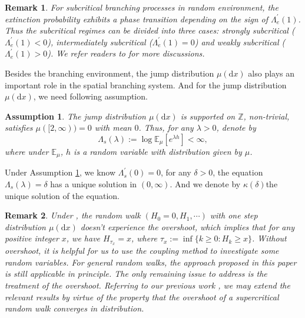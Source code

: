 \documentclass[]{article}
\numberwithin{equation}{section}
\theoremstyle{thmstyleone}%
\theoremstyle{thmstyletwo}%
\newtheorem{remark}{Remark}%
\theoremstyle{thmstylethree}%
\theoremstyle{thmstylefour}%
\theoremstyle{thmstylefive}%
\newtheorem{assumption}{Assumption}
\theoremstyle{thmstylesix}%
\renewcommand{\d}{\mathrm{d}}
\newcommand{\E}{\mathbb{E}}
\begin{document}
	\begin{remark}\label{R1}
		For subcritical branching processes in random environment, the extinction probability exhibits a phase transition depending on the sign of $\Lambda_e^\prime(1)$. Thus the subcritical regimes can be divided into three cases: strongly subcritical ($\Lambda_e^\prime(1)<0$), intermediately  subcritical ($\Lambda_e^\prime(1)=0$) and weakly subcritical ($\Lambda_e^\prime(1)>0$). We refer readers to \cite{B2} for more discussions.
	\end{remark}
	
	Besides the branching environment, the jump distribution $\mu(\d x)$ also plays an important role in the spatial branching system. And for the jump distribution $\mu(\d x)$, we need following assumption.
	\begin{assumption}\label{Jump Assumption}
		The jump distribution $\mu(\d x)$ is  supported on $\mathbb{Z}$, non-trivial, satisfies $\mu([2,\infty)) = 0$ with mean $0$. Thus, for any $\lambda>0$, denote by
		\begin{equation}
			\Lambda_s(\lambda):=\log \E_\mu\left[ e^{\lambda h}\right]<\infty,
		\end{equation}
	where under $\E_\mu$, $h$ is a random variable with distribution given by $\mu$. 
	\end{assumption}
	
	Under Assumption \ref{Jump Assumption}, we know $\Lambda_s^\prime(0)=0$, for any $\delta>0$, the equation $\Lambda_s(\lambda) =\delta $ has a unique solution in $(0,\infty)$. And we denote by $\kappa(\delta)$the unique solution of the equation.
	
	\begin{remark}\label{R2}
		Under , the random walk $\left(H_0=0,H_1,\cdots\right)$ with one step distribution $\mu(\d x)$ doesn't experience the overshoot, which implies that for any positive integer $x$, we have $H_{\tau_x}=x$, where $\tau_x:= \inf\{k\geqslant 0:H_k\geqslant x\}$. Without overshoot, it is helpful for us to use the coupling method to investigate some random variables. For general random walks, the approach proposed in this paper is still applicable in principle. The only remaining issue to address is the treatment of the overshoot. Referring to our previous work \cite{Fu2025}, we may extend the relevant results by virtue of the property that the overshoot of a supercritical random walk converges in distribution.
	\end{remark}
	
\end{document}
